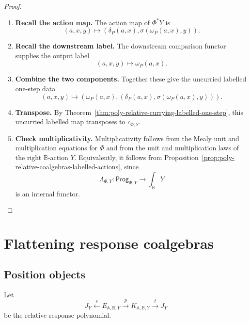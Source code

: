 \begin{proof}
\leavevmode
\begin{enumerate}
\item \textbf{Recall the action map.}
The action map of \(\Phi^\ast Y\) is
\[
(a,x,y)
\longmapsto
\left(
\delta_P(a,x),
\sigma(\omega_P(a,x),y)
\right).
\]

\item \textbf{Recall the downstream label.}
The downstream comparison functor supplies the output label
\[
(a,x,y)\longmapsto\omega_P(a,x).
\]

\item \textbf{Combine the two components.}
Together these give the uncurried labelled one-step data
\[
(a,x,y)
\longmapsto
\left(
\omega_P(a,x),
\left(
\delta_P(a,x),
\sigma(\omega_P(a,x),y)
\right)
\right).
\]

\item \textbf{Transpose.}
By Theorem~\ref{thm:poly-relative-currying-labelled-one-step}, this
uncurried labelled map transposes to \(c_{\Phi,Y}\).

\item \textbf{Check multiplicativity.}
Multiplicativity follows from the Mealy unit and multiplication equations for
\(\Phi\) and from the unit and multiplication laws of the right
\(\mathbb B\)-action \(Y\).  Equivalently, it follows from
Proposition~\ref{prop:poly-relative-coalgebras-labelled-actions}, since
\[
\Lambda_{\Phi,Y}:\mathsf{Prog}_{\Phi,Y}\to\int_{\mathbb B}Y
\]
is an internal functor.
\end{enumerate}
\end{proof}

\section{Flattening response coalgebras}
\label{sec:poly-relative-flattening}

\subsection{Position objects}
\label{subsec:poly-relative-position-objects}

Let
\[
J_Y
\xleftarrow{s}
E_{\mathbb A,\mathbb B,Y}
\xrightarrow{p}
K_{\mathbb A,\mathbb B,Y}
\xrightarrow{t}
J_Y
\]
be the relative response polynomial.

